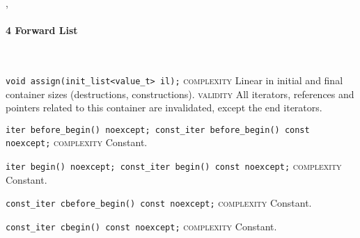 \sep
{}
\paragraph{4 Forward List}\mbox{}\vspace{0.5em}\\
\noindent{}\hspace*{0.25em}\lstinline[basicstyle=\ttfamily\color{corange}]{void assign(init_list<value_t> il);} \textsc{complexity} Linear in initial and final container sizes (destructions, constructions). \textsc{validity} All iterators, references and pointers related to this container are invalidated, except the end iterators.\\\vspace{-0.6em}

\noindent{}\hspace*{0.25em}\lstinline[basicstyle=\ttfamily\color{cgreen}]{iter before_begin() noexcept; const_iter before_begin() const noexcept;} \textsc{complexity} Constant.\\\vspace{-0.6em}

\noindent{}\hspace*{0.25em}\lstinline[basicstyle=\ttfamily\color{cgreen}]{iter begin() noexcept; const_iter begin() const noexcept;} \textsc{complexity} Constant.\\\vspace{-0.6em}

\noindent{}\hspace*{0.25em}\lstinline[basicstyle=\ttfamily\color{cgreen}]{const_iter cbefore_begin() const noexcept;} \textsc{complexity} Constant.\\\vspace{-0.6em}

\noindent{}\hspace*{0.25em}\lstinline[basicstyle=\ttfamily\color{cgreen}]{const_iter cbegin() const noexcept;} \textsc{complexity} Constant.\\\vspace{-0.6em}

